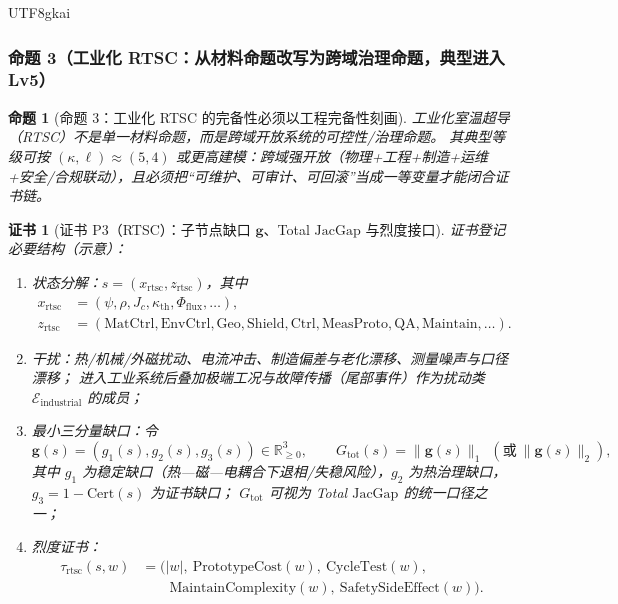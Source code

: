 \documentclass[12pt]{article}
\newtheorem{proposition}{命题}[section]
\newtheorem{Certificate}{证书}[section]
\newcommand{\RR}{\ensuremath{\mathbb{R}}}
\newcommand{\JacGap}{\ensuremath{\mathrm{JacGap}}}
\newcommand{\Cert}{\ensuremath{\mathrm{Cert}}}
\begin{document}
\begin{CJK*}{UTF8}{gkai}
\subsubsection{命题 3（工业化 RTSC：从材料命题改写为跨域治理命题，典型进入 Lv5）}
\label{subsubsec:tex25-rtsc}

\begin{proposition}[命题 3：工业化 RTSC 的完备性必须以工程完备性刻画]
\label{prop:tex25-rtsc}
工业化室温超导（RTSC）不是单一材料命题，而是跨域开放系统的可控性/治理命题。
其典型等级可按 $(\kappa,\ell)\approx(5,4)$ 或更高建模：跨域强开放（物理+工程+制造+运维+安全/合规联动），且必须把“可维护、可审计、可回滚”当成一等变量才能闭合证书链。
\end{proposition}

\begin{Certificate}[证书 P3（RTSC）：子节点缺口 $\mathbf{g}$、Total \JacGap{} 与烈度接口]
\label{cert:tex25-rtsc}
证书登记必要结构（示意）：
\begin{enumerate}
  \item 状态分解：$s=(x_{\mathrm{rtsc}},z_{\mathrm{rtsc}})$，其中
  \[
    \begin{aligned}
      x_{\mathrm{rtsc}}
      &= (\psi,\rho,J_c,\kappa_{\mathrm{th}},\Phi_{\mathrm{flux}},\dots),
      \\
      z_{\mathrm{rtsc}}
      &= (\mathrm{MatCtrl},\mathrm{EnvCtrl},\mathrm{Geo},\mathrm{Shield},\mathrm{Ctrl},\mathrm{MeasProto},\mathrm{QA},
      \mathrm{Maintain},\dots).
    \end{aligned}
  \]
  \item 干扰：热/机械/外磁扰动、电流冲击、制造偏差与老化漂移、测量噪声与口径漂移；
  进入工业系统后叠加极端工况与故障传播（尾部事件）作为扰动类 $\mathcal{E}_{\mathrm{industrial}}$ 的成员；
  \item 最小三分量缺口：令
  \[
    \mathbf{g}(s)=(g_1(s),g_2(s),g_3(s))\in\RR_{\ge 0}^{3},
    \qquad
    G_{\mathrm{tot}}(s)=\|\mathbf{g}(s)\|_1\ \ (\text{或}\ \|\mathbf{g}(s)\|_2),
  \]
  其中 $g_1$ 为稳定缺口（热—磁—电耦合下退相/失稳风险），$g_2$ 为热治理缺口，$g_3=1-\Cert(s)$ 为证书缺口；
  $G_{\mathrm{tot}}$ 可视为 Total \JacGap{} 的统一口径之一；
  \item 烈度证书：
  \[
    \begin{aligned}
      \tau_{\mathrm{rtsc}}(s,w)
      &=
      (|w|,\ \mathrm{PrototypeCost}(w),\ \mathrm{CycleTest}(w),
      \\
      &\qquad
      \mathrm{MaintainComplexity}(w),\ \mathrm{SafetySideEffect}(w)).
    \end{aligned}
  \]
\end{enumerate}
\end{Certificate}


\end{CJK*}
\end{document}

